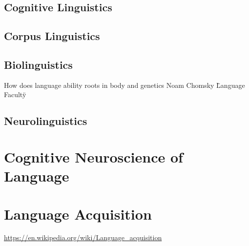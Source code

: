 \documentclass[a4paper]{article}
\begin{document}
        \subsection{Cognitive Linguistics}
        
        \subsection{Corpus Linguistics}
        
        \subsection{Biolinguistics}
            How does language ability roots in body and genetics
            Noam Chomsky \"Language Faculty\"
        
        \subsection{Neurolinguistics}
    
    
    \section{Cognitive Neuroscience of Language}
    
    
    \section{Language Acquisition}
        \url{https://en.wikipedia.org/wiki/Language_acquisition}
        
        
\end{document}
